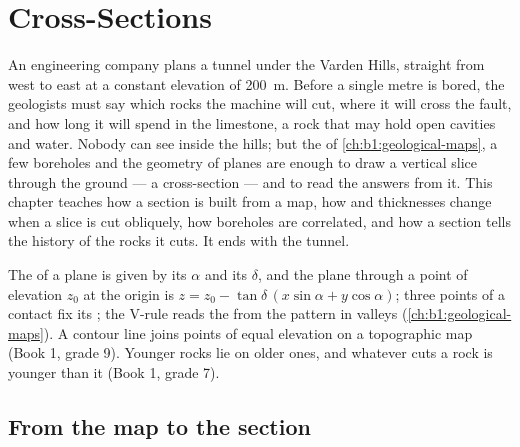 \chapter{Cross-Sections}\label{ch:b1:cross-sections}

An engineering company plans a tunnel under the Varden Hills, straight from
west to east at a constant elevation of \qty{200}{m}. Before a single metre
is bored, the geologists must say which rocks the machine will cut, where it
will cross the fault, and how long it will spend in the limestone, a rock
that may hold open cavities and water. Nobody can see inside the hills; but
the  of \cref{ch:b1:geological-maps}, a few boreholes and the
geometry of planes are enough to draw a vertical slice through the ground ---
a cross-section --- and to read the answers from it. This chapter teaches how
a section is built from a map, how  and thicknesses change when a slice
is cut obliquely, how boreholes are correlated, and how a section tells the
history of the rocks it cuts. It ends with the tunnel.

\begin{recall}
The  of a plane is given by its  $\alpha$ and its 
$\delta$, and the plane through a point of elevation $z_0$ at the origin is
$z = z_0 - \tan\delta\,(x\sin\alpha + y\cos\alpha)$; three points of a
contact fix its ; the V-rule reads the  from the  pattern
in valleys (\cref{ch:b1:geological-maps}). A contour line joins points of
equal elevation on a topographic map (Book 1, grade 9). Younger rocks lie on
older ones, and whatever cuts a rock is younger than it (Book 1, grade 7).
\end{recall}

\section{From the map to the section}

